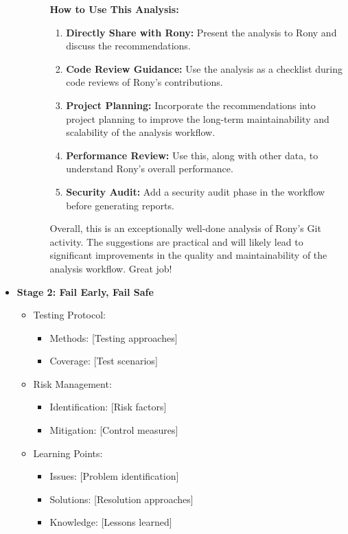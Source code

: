 \documentclass{article}
\begin{document}
\begin{itemize}
\begin{itemize}
\begin{itemize}
\textbf{How to Use This Analysis:}
\begin{enumerate}
                \item \textbf{Directly Share with Rony:} Present the analysis to Rony and discuss the recommendations.
                \item \textbf{Code Review Guidance:} Use the analysis as a checklist during code reviews of Rony's contributions.
                \item \textbf{Project Planning:} Incorporate the recommendations into project planning to improve the long-term maintainability and scalability of the analysis workflow.
                \item \textbf{Performance Review:} Use this, along with other data, to understand Rony's overall performance.
    \item \textbf{Security Audit:} Add a security audit phase in the workflow before generating reports.
\end{enumerate}
Overall, this is an exceptionally well-done analysis of Rony's Git activity. The suggestions are practical and will likely lead to significant improvements in the quality and maintainability of the analysis workflow. Great job!
        \end{itemize}
    \end{itemize}
    \item \textbf{Stage 2: Fail Early, Fail Safe}
    \begin{itemize}
        \item Testing Protocol:
        \begin{itemize}
            \item Methods: [Testing approaches]
            \item Coverage: [Test scenarios]
        \end{itemize}
        \item Risk Management:
        \begin{itemize}
            \item Identification: [Risk factors]
            \item Mitigation: [Control measures]
        \end{itemize}
        \item Learning Points:
        \begin{itemize}
            \item Issues: [Problem identification]
            \item Solutions: [Resolution approaches]
            \item Knowledge: [Lessons learned]

\end{itemize}
\end{itemize}
\end{itemize}
\end{document}
